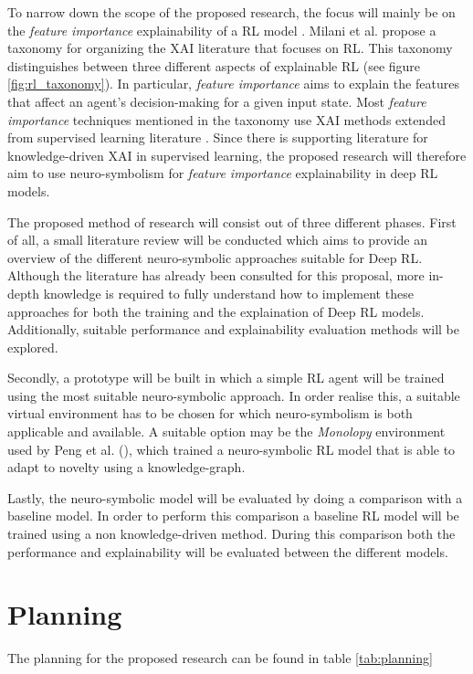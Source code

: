 \documentclass[11pt]{article}
\begin{document}
To narrow down the scope of the proposed research, the focus will mainly be on the \textit{feature importance} explainability of a RL model \cite{Milani2022}.
Milani et al. propose a taxonomy for organizing the XAI literature that focuses on RL. This taxonomy distinguishes between three different aspects of explainable RL (see figure \ref{fig:rl_taxonomy}).
In particular, \textit{feature importance} aims to explain the features that affect an agent's decision-making for a given input state.
Most \textit{feature importance} techniques mentioned in the taxonomy use XAI methods extended from supervised learning literature \cite{greydanus_visualizing_2018,goel_unsupervised_2018,ehsan_rationalization_2017}. 
Since there is supporting literature for knowledge-driven XAI in supervised learning, the proposed research will therefore aim to use neuro-symbolism for \textit{feature importance} explainability in deep RL models.

The proposed method of research will consist out of three different phases. First of all, a small literature review will be conducted which aims to provide an overview of the different neuro-symbolic approaches suitable for Deep RL.
Although the literature has already been consulted for this proposal, more in-depth knowledge is required to fully understand how to implement these approaches for both the training and the explaination of Deep RL models.
Additionally, suitable performance and explainability evaluation methods will be explored.

Secondly, a prototype will be built in which a simple RL agent will be trained using the most suitable neuro-symbolic approach. 
In order realise this, a suitable virtual environment has to be chosen for which neuro-symbolism is both applicable and available. 
A suitable option may be the \textit{Monolopy} environment used by Peng et al. (\citeyear{peng_detecting_2021}), which trained a neuro-symbolic RL model that is able to adapt to novelty using a knowledge-graph.

Lastly, the neuro-symbolic model will be evaluated by doing a comparison with a baseline model. In order to perform this comparison a baseline RL model will be trained using a non knowledge-driven method.
During this comparison both the performance and explainability will be evaluated between the different models.

\section{Planning}
The planning for the proposed research can be found in table \ref{tab:planning}
\end{document}
